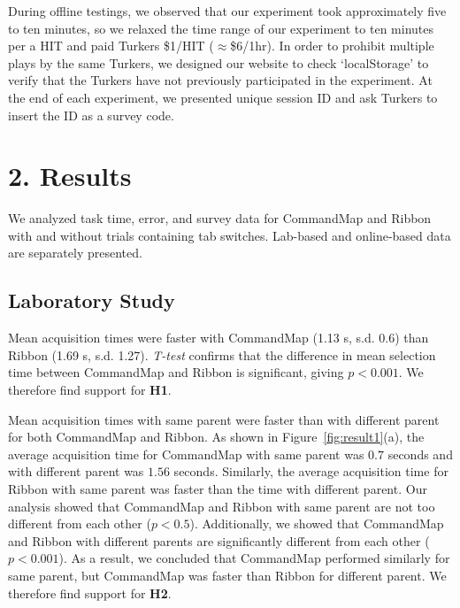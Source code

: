 \documentclass{article}
\begin{document}
During offline testings, we observed that our experiment took approximately five to ten minutes, so we relaxed the time range of our experiment to ten minutes per a HIT and paid Turkers \$1/HIT ($\approx$\$6/1hr). In order to prohibit multiple plays by the same Turkers, we designed our website to check `localStorage' to verify that the Turkers have not previously participated in the experiment. At the end of each experiment, we presented unique session ID and ask Turkers to insert the ID as a survey code. 

\section*{2. Results} 
We analyzed task time, error, and survey data for CommandMap and Ribbon with and without trials containing tab switches. Lab-based and online-based data are separately presented.
\subsection*{Laboratory Study}
Mean acquisition times were faster with CommandMap (1.13 s, s.d. 0.6) than Ribbon (1.69 s, s.d. 1.27). \textit{T-test} confirms that the difference in mean selection time between CommandMap and Ribbon is significant, giving $p<0.001$. We therefore find support for \textbf{H1}.


Mean acquisition times with same parent were faster than with different parent for both CommandMap and Ribbon. As shown in Figure~\ref{fig:result1}(a), the average acquisition time for CommandMap with same parent was $0.7$ seconds and with different parent was $1.56$ seconds. Similarly, the average acquisition time for Ribbon with same parent was faster than the time with different parent. Our analysis showed that CommandMap and Ribbon with same parent are not too different from each other ($p<0.5$). Additionally, we showed that CommandMap and Ribbon with different parents are significantly different from each other ($p<0.001$). As a result, we concluded that CommandMap performed similarly for same parent, but CommandMap was faster than Ribbon for different parent. We therefore find support for \textbf{H2}. 
\end{document}
